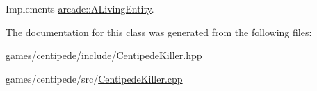 Implements \hyperlink{classarcade_1_1_a_living_entity_a73b611bacb561279a6118131f2692674}{arcade\-::\-A\-Living\-Entity}.



The documentation for this class was generated from the following files\-:\begin{DoxyCompactItemize}
\item 
games/centipede/include/\hyperlink{_centipede_killer_8hpp}{Centipede\-Killer.\-hpp}\item 
games/centipede/src/\hyperlink{_centipede_killer_8cpp}{Centipede\-Killer.\-cpp}\end{DoxyCompactItemize}
